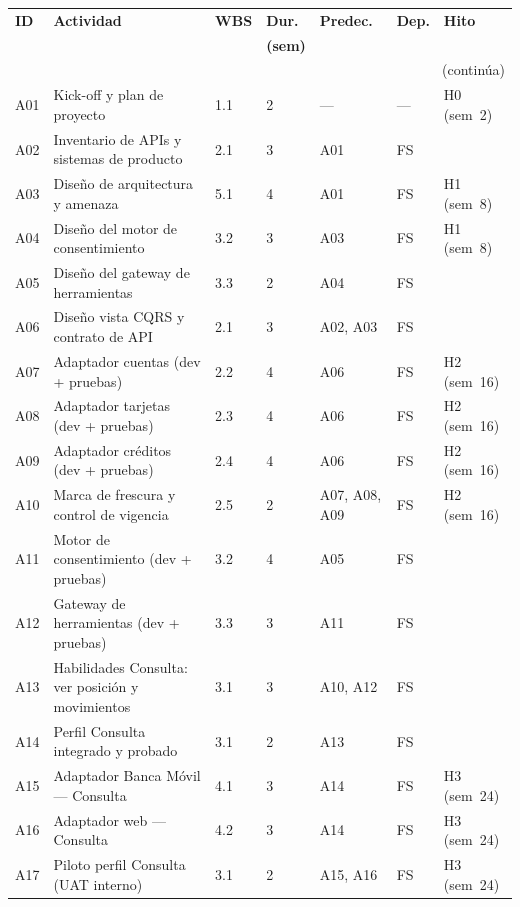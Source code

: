 \documentclass[11pt]{article}
\begin{document}
\begin{longtable}{@{}p{0.7cm} p{4.1cm} p{0.8cm} p{1.2cm} p{1.6cm} p{1.0cm} p{2.3cm}@{}}
\toprule
\textbf{ID} & \textbf{Actividad} & \textbf{WBS} & \textbf{Dur.} & \textbf{Predec.} & \textbf{Dep.} & \textbf{Hito} \\
 & & & \textbf{(sem)} & & & \\
\midrule
\endhead
\midrule\multicolumn{7}{r}{\small(continúa)}\\
\endfoot
\bottomrule
\endlastfoot
A01 & Kick-off y plan de proyecto        & 1.1 & 2  & —              & —  & H0 (sem~2) \\
A02 & Inventario de APIs y sistemas de producto & 2.1 & 3  & A01       & FS & \\
A03 & Diseño de arquitectura y amenaza   & 5.1 & 4  & A01            & FS & H1 (sem~8) \\
A04 & Diseño del motor de consentimiento & 3.2 & 3  & A03            & FS & H1 (sem~8) \\
A05 & Diseño del gateway de herramientas & 3.3 & 2  & A04            & FS & \\
A06 & Diseño vista CQRS y contrato de API & 2.1 & 3 & A02, A03       & FS & \\
A07 & Adaptador cuentas (dev + pruebas)  & 2.2 & 4  & A06            & FS & H2 (sem~16) \\
A08 & Adaptador tarjetas (dev + pruebas) & 2.3 & 4  & A06            & FS & H2 (sem~16) \\
A09 & Adaptador créditos (dev + pruebas) & 2.4 & 4  & A06            & FS & H2 (sem~16) \\
A10 & Marca de frescura y control de vigencia & 2.5 & 2 & A07, A08, A09 & FS & H2 (sem~16) \\
A11 & Motor de consentimiento (dev + pruebas) & 3.2 & 4 & A05         & FS & \\
A12 & Gateway de herramientas (dev + pruebas) & 3.3 & 3 & A11         & FS & \\
A13 & Habilidades Consulta: ver posición y movimientos & 3.1 & 3 & A10, A12 & FS & \\
A14 & Perfil Consulta integrado y probado & 3.1 & 2 & A13             & FS & \\
A15 & Adaptador Banca Móvil — Consulta   & 4.1 & 3  & A14            & FS & H3 (sem~24) \\
A16 & Adaptador web — Consulta           & 4.2 & 3  & A14            & FS & H3 (sem~24) \\
A17 & Piloto perfil Consulta (UAT interno) & 3.1 & 2 & A15, A16      & FS & H3 (sem~24) \\

\end{longtable}
\end{document}
